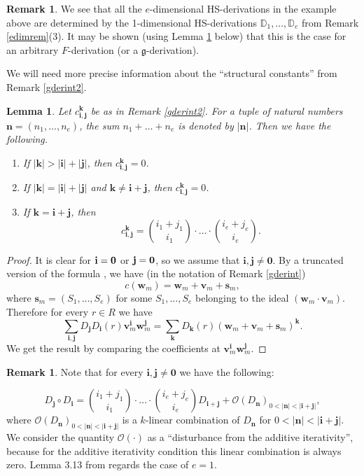\documentclass[10pt]{amsart}
\newtheorem{lemma}[theorem]{Lemma}
\theoremstyle{definition}
\newtheorem{remark}[theorem]{Remark}
\begin{document}
\begin{remark}\label{onedimenough}
We see that all the $e$-dimensional HS-derivations in the example above are determined by the 1-dimensional HS-derivations $\mathbb{D}_1,\ldots,\mathbb{D}_e$ from Remark \ref{edimrem}(3). It may be shown (using Lemma \ref{newton} below) that this is the case for an arbitrary $F$-derivation (or a $\mathfrak{g}$-derivation).
\end{remark}\noindent
We will need more precise information about the ``structural constants'' from Remark \ref{gderint2}.
\begin{lemma}\label{newton}
Let $c_{\mathbf{i},\mathbf{j}}^{\mathbf{k}}$ be as in Remark \ref{gderint2}. For a tuple of natural numbers $\mathbf{n}=(n_1,\ldots,n_e)$, the sum $n_1+\ldots+n_e$ is denoted by $|\mathbf{n}|$. Then we have the following.
\begin{enumerate}
\item If $|\mathbf{k}|>|\mathbf{i}|+|\mathbf{j}|$, then $c_{\mathbf{i},\mathbf{j}}^{\mathbf{k}}=0$.

\item If $|\mathbf{k}|=|\mathbf{i}|+|\mathbf{j}|$ and $\mathbf{k}\neq \mathbf{i}+\mathbf{j}$, then $c_{\mathbf{i},\mathbf{j}}^{\mathbf{k}}=0$.

\item If $\mathbf{k}=\mathbf{i}+\mathbf{j}$, then
$$c_{\mathbf{i},\mathbf{j}}^{\mathbf{k}}={i_1+j_1 \choose i_1}\cdot \ldots \cdot {i_e+j_e \choose i_e}.$$
\end{enumerate}
\end{lemma}
\begin{proof}
It is clear for $\text{\textbf{i}}=\mathbf{0}$ or $\text{\textbf{j}}=\mathbf{0}$, so we assume that $\mathbf{i},\mathbf{j}\neq \mathbf{0}$. By a truncated version of the formula \cite[(14.1.1)]{Hazew}, we have (in the notation of Remark \ref{gderint})
$$c(\mathbf{w}_m)=\mathbf{w}_m+\mathbf{v}_m+\mathbf{s}_m,$$
where $\mathbf{s}_m=(S_1,\ldots,S_e)$ for some $S_1,\ldots,S_e$ belonging to the ideal $(\mathbf{w}_m\cdot \mathbf{v}_m)$. Therefore for every $r\in R$ we have
$$\sum_{\mathbf{i},\mathbf{j}} D_{\mathbf{j}}D_{\mathbf{i}}(r)\mathbf{v}_m^{\mathbf{i}}\mathbf{w}_m^{\mathbf{j}}=
\sum_{\mathbf{k}} D_{\mathbf{k}}(r)(\mathbf{w}_m+\mathbf{v}_m+\mathbf{s}_m)^{\mathbf{k}}.$$
We get the result by comparing the coefficients at $\mathbf{v}_m^{\mathbf{i}}\mathbf{w}_m^{\mathbf{j}}$.
\end{proof}
\begin{remark}
 Note that for every $\mathbf{i}, \mathbf{j}\neq \mathbf{0}$ we have the following:

 $$D_{\mathbf{j}}\circ D_{\mathbf{i}}={i_1+j_1 \choose i_1}\cdot\ldots\cdot{i_e+j_e \choose i_e}D_{\mathbf{i}+\mathbf{j}}
 +\mathcal{O}(D_{\mathbf{n}})_{0<|\mathbf{n}|<|\mathbf{i}+\mathbf{j}|},$$
 where $\mathcal{O}(D_{\mathbf{n}})_{0<|\mathbf{n}|<|\mathbf{i}+\mathbf{j}|}$ is a $k$-linear combination of
 $D_{\mathbf{n}}$ for $0<|\mathbf{n}|<|\mathbf{i}+\mathbf{j}|$. We consider the quantity $\mathcal{O}(\cdot)$ as a ``disturbance from the additive iterativity'', because for the additive iterativity condition this linear combination is always zero. Lemma 3.13 from \cite{HK1} regards the case of $e=1$.
\end{remark}
\end{document}
